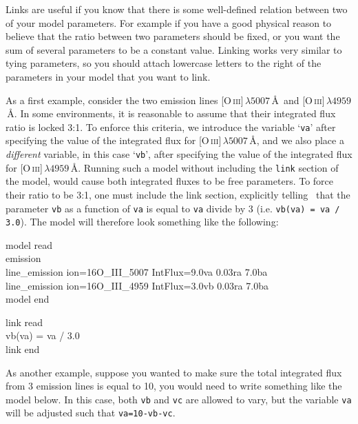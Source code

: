 Links are useful if you know that there is some well-defined relation between two
of your model parameters. For example if you have a good physical reason to believe
that the ratio between two parameters should be fixed, or you want the sum of several
parameters to be a constant value. Linking works very similar to tying parameters, so
you should attach lowercase letters to the right of the parameters in your model that
you want to link.

As a first example, consider the two emission lines [O\,\textsc{iii}]\,$\lambda5007$\,\AA\
and [O\,\textsc{iii}]\,$\lambda4959$\,\AA. In some environments, it is reasonable to assume
that their integrated flux ratio is locked 3:1. To enforce this criteria, we introduce the variable
`\texttt{va}' after specifying the value of the integrated flux for [O\,\textsc{iii}]\,$\lambda5007$\,\AA,
and we also place a \textit{different} variable, in this case `\texttt{vb}', after specifying the value of
the integrated flux for [O\,\textsc{iii}]\,$\lambda4959$\,\AA. Running such a model without
including the \texttt{link} section of the model, would cause both integrated fluxes to be free
parameters. To force their ratio to be 3:1, one must include the link section, explicitly telling
\alis\ that the parameter \texttt{vb} as a function of \texttt{va} is equal to \texttt{va} divide by 3
(i.e. \texttt{vb(va) = va / 3.0}). The model will therefore look something like the following:

\vspace{0.3cm}
\begin{mdframed}[style=MyFrame]
model read\\
emission\\
line\_emission ion=16O\_III\_5007     IntFlux=9.0va         0.03ra       7.0ba\\
line\_emission ion=16O\_III\_4959     IntFlux=3.0vb         0.03ra       7.0ba\\
model end\\

\vspace{0.1cm}

\noindent
link read\\
vb(va) = va / 3.0\\
link end\\
\end{mdframed}
\vspace{0.2cm}

As another example, suppose you wanted to make sure the total integrated flux
from 3 emission lines is equal to 10, you would need to write something like the
model below. In this case, both \texttt{vb} and \texttt{vc} are allowed to vary, but
the variable \texttt{va} will be adjusted such that \texttt{va=10-vb-vc}.

